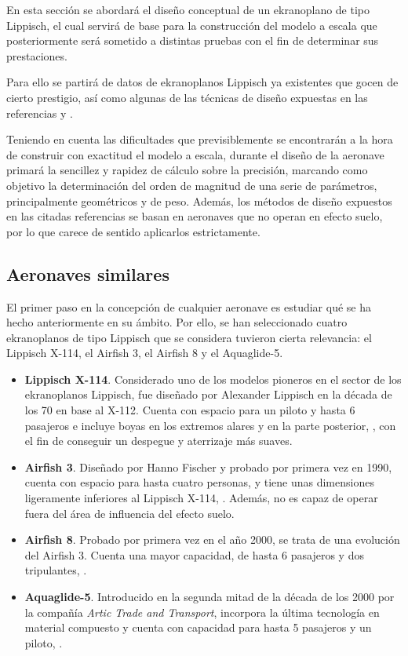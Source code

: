 En esta sección se abordará el diseño conceptual de un ekranoplano de tipo Lippisch, el cual servirá de base para la construcción del modelo a escala que posteriormente será sometido a distintas pruebas con el fin de determinar sus prestaciones.

Para ello se partirá de datos de ekranoplanos Lippisch ya existentes que gocen de cierto prestigio, así como algunas de las técnicas de diseño expuestas en las referencias \cite{ref:raymer} y \cite{ref:roskam}.

Teniendo en cuenta las dificultades que previsiblemente se encontrarán a la hora de construir con exactitud el modelo a escala, durante el diseño de la aeronave primará la sencillez y rapidez de cálculo sobre la precisión, marcando como objetivo la determinación del orden de magnitud de una serie de parámetros, principalmente geométricos y de peso. Además, los métodos de diseño expuestos en las citadas referencias se basan en aeronaves que no operan en efecto suelo, por lo que carece de sentido aplicarlos estrictamente.


\subsection{Aeronaves similares}
\label{sec:design:similar}

El primer paso en la concepción de cualquier aeronave es estudiar qué se ha hecho anteriormente en su ámbito. Por ello, se han seleccionado cuatro ekranoplanos de tipo Lippisch que se considera tuvieron cierta relevancia: el Lippisch X-114, el Airfish 3, el Airfish 8 y el Aquaglide-5.

\begin{itemize}
\item \textbf{Lippisch X-114}. Considerado uno de los modelos pioneros en el sector de los ekranoplanos Lippisch, fue diseñado por Alexander Lippisch en la década de los 70 en base al X-112. Cuenta con espacio para un piloto y hasta 6 pasajeros e incluye boyas en los extremos alares y en la parte posterior, , con el fin de conseguir un despegue y aterrizaje más suaves.
\item \textbf{Airfish 3}. Diseñado por Hanno Fischer y probado por primera vez en 1990, cuenta con espacio para hasta cuatro personas, y tiene unas dimensiones ligeramente inferiores al Lippisch X-114, . Además, no es capaz de operar fuera del área de influencia del efecto suelo.
\item \textbf{Airfish 8}. Probado por primera vez en el año 2000, se trata de una evolución del Airfish 3. Cuenta una mayor capacidad, de hasta 6 pasajeros y dos tripulantes, .
\item \textbf{Aquaglide-5}. Introducido en la segunda mitad de la década de los 2000 por la compañía \emph{Artic Trade and Transport}, incorpora la última tecnología en material compuesto y cuenta con capacidad para hasta 5 pasajeros y un piloto, .
\end{itemize}

